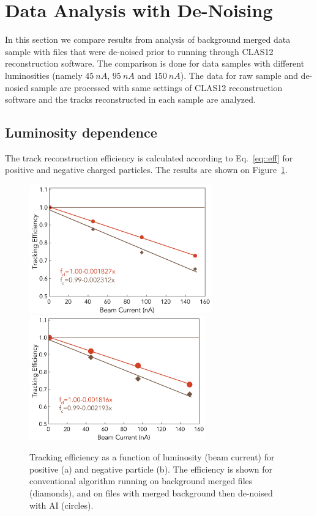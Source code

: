 \section{Data Analysis with De-Noising}

In this section we compare results from analysis of background merged data sample with files that were de-noised prior to running through CLAS12 reconstruction software. The comparison is done for data samples with different luminosities (namely $45~nA$, $95~nA$ and $150~nA$). The data for raw sample and de-nosied sample are processed with same settings of CLAS12 reconstruction software and the tracks reconstructed in each sample are analyzed.

\subsection{Luminosity dependence}

The track reconstruction efficiency is calculated according to Eq.~\ref{eq::eff} for positive and negative charged particles. The results are shown on Figure~\ref{lscan::conv_dn}. 

\begin{figure}[!h]
\begin{center}
 \includegraphics[width=3.1in]{images/figure_lscan_pos.pdf}
 \includegraphics[width=3in]{images/figure_lscan_neg.pdf}
\caption {Tracking efficiency as a function of luminosity (beam current) for positive (a) and negative particle (b).  The efficiency is shown for
conventional algorithm running on background merged files (diamonds), and on files with merged background then de-noised with AI (circles).}
 \label{lscan::conv_dn}
 \end{center}
\end{figure}

